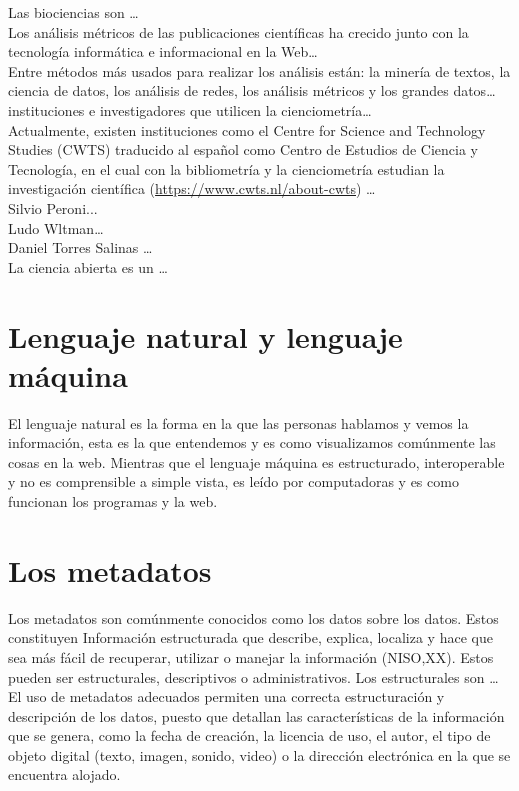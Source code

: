 \documentclass[../Main.tex]{subfiles}
\begin{document}
Las biociencias son …\\

Los análisis métricos de las publicaciones científicas ha crecido junto con la tecnología informática e informacional en la Web…\\

Entre métodos más usados para realizar los análisis están: la minería de textos, la ciencia de datos, los análisis de redes, los análisis métricos y los grandes datos… \\

instituciones e investigadores que utilicen la cienciometría… \\

Actualmente, existen instituciones como el Centre for Science and Technology Studies (CWTS) traducido al español como Centro de Estudios de Ciencia y Tecnología, en el cual con la bibliometría y la cienciometría estudian la investigación científica (\url{https://www.cwts.nl/about-cwts}) …\\

Silvio Peroni...\\
Ludo Wltman…\\
Daniel Torres Salinas …\\
La ciencia abierta es un …
\section{Lenguaje natural y lenguaje máquina}
\noindent
El lenguaje natural es la forma en la que las personas hablamos y vemos la información, esta es la que entendemos y es como visualizamos comúnmente las cosas en la web. Mientras que el lenguaje máquina es estructurado, interoperable y no es comprensible a simple vista, es leído por computadoras y es como funcionan los programas y la web. 

\section{Los metadatos}
\noindent
Los metadatos son comúnmente conocidos como los datos sobre los datos. Estos constituyen Información estructurada que describe, explica, localiza y hace que sea más fácil de recuperar, utilizar o manejar la información (NISO,XX). Estos pueden ser estructurales, descriptivos o administrativos. Los estructurales son …\\

El uso de metadatos adecuados permiten una correcta estructuración y descripción de los datos, puesto que detallan las características de la información que se genera, como la fecha de creación, la licencia de uso, el autor, el tipo de objeto digital (texto, imagen, sonido, video) o la dirección electrónica en la que se encuentra alojado.\\
\end{document}
